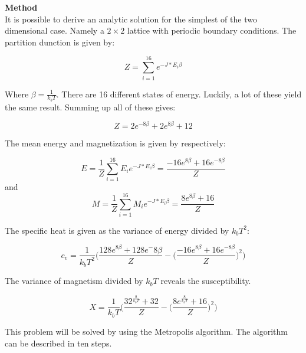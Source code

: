 \documentclass[10pt,a4paper]{article}
\begin{document}
{\LARGE\bf
Method
}\\

\noindent It is possible to derive an analytic solution for the simplest of the two dimensional case. Namely a $2 \times 2$ lattice with periodic boundary conditions. The partition dunction is given by:

\begin{equation}
Z= \sum\limits_{i=1}^{16}  e^{-J*E_{i}\beta}
\end{equation}

\noindent Where $\beta= \frac{1}{k_b T}$.  There are 16 different states of energy. Luckily, a lot of these yield the same result. Summing up all of these gives:

\begin{equation}
Z=2e^{-8\beta}+2e^{8\beta}+12
\end{equation}

\noindent The mean energy and magnetization is given by respectively:

\begin{equation}
E=\frac{1}{Z} \sum\limits_{i=1}^{16}  E_{i}e^{-J*E_{i}\beta}=\frac{-16e^{8\beta}+16e^{-8\beta}}{Z}
\end{equation}
and
\begin{equation}
M=\frac{1}{Z}\sum\limits_{i=1}^{16}  M_{i}e^{-J*E_{i}\beta}=\frac{8e^{8\beta}+16}{Z}
\end{equation}

\noindent The specific heat is given as the variance of energy divided by $k_b T^2$:

\begin{equation} 
c_v =\frac{1}{k_b T^2} \Bigg(\frac{128e^{8\beta}+128e^-8\beta}{Z}-\Big(\frac{-16e^{8\beta}+16e^{-8\beta}}{Z}\Big)^2\Bigg)
\end{equation}

\noindent The variance of magnetism divided by $k_b T$ reveals the susceptibility.

\begin{equation}
X=\frac{1}{k_b T} \Bigg(\frac{32^{\frac{8}{k_b T}}+32}{Z} - \Big(\frac{8e^{\frac{8}{k_b T}}+16}{Z}\Big)^2\Bigg)
\end{equation}

\noindent This problem will be solved by using the Metropolis algorithm. The algorithm can be described in ten steps. 
\end{document}
